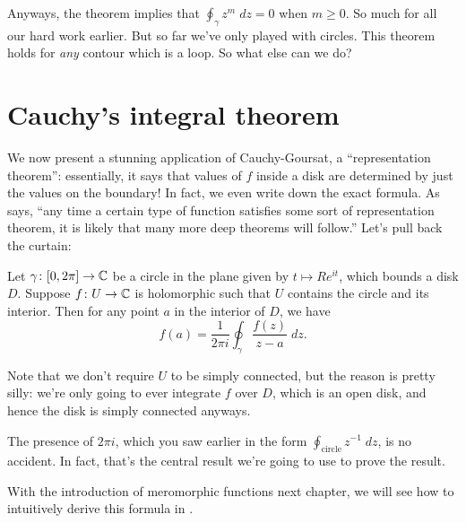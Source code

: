 Anyways, the theorem implies that $\oint_\gamma z^m \; dz = 0$ when $m \ge 0$.
So much for all our hard work earlier.
But so far we've only played with circles.
This theorem holds for \emph{any} contour which is a loop.
So what else can we do?

\section{Cauchy's integral theorem}
We now present a stunning application of Cauchy-Goursat, a ``representation theorem'':
essentially, it says that values of $f$ inside a disk
are determined by just the values on the boundary!
In fact, we even write down the exact formula.
As \cite{ref:dartmouth} says,
``any time a certain type of function satisfies some sort of representation theorem,
it is likely that many more deep theorems will follow.''
Let's pull back the curtain:

\begin{theorem}
	\label{thm:cauchy_integral_formula}
	Let $\gamma \colon [0,2\pi] \to \mathbb C$ be a circle in the plane given by $t \mapsto Re^{it}$,
	which bounds a disk $D$.
	Suppose $f \colon U \to \mathbb C$ is holomorphic such that $U$ contains the circle and its interior.
	Then for any point $a$ in the interior of $D$, we have
	\[
		f(a)
		=
		\frac{1}{2\pi i} \oint_\gamma \frac{f(z)}{z-a} \; dz.
	\]
\end{theorem}
Note that we don't require $U$ to be simply connected, but the reason is pretty silly:
we're only going to ever integrate $f$ over $D$, which is an open disk, and hence the disk
is simply connected anyways.

The presence of $2\pi i$, which you saw earlier in the form $\oint_{\text{circle}} z^{-1} \; dz$,
is no accident.
In fact, that's the central result we're going to use to prove the result.

\begin{remark}
	With the introduction of meromorphic functions next chapter, we will see how to intuitively
	derive this formula in .
\end{remark}

